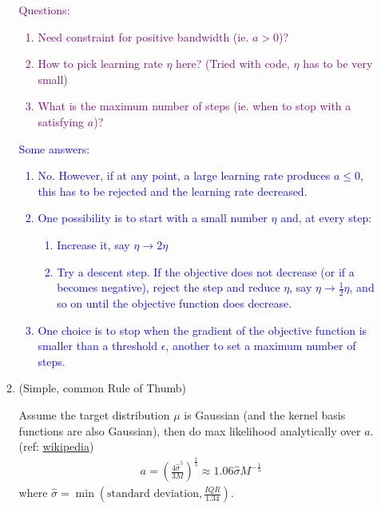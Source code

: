 \documentclass[11pt]{article}
\begin{document}
\begin{enumerate}
\begin{enumerate}
        \textcolor{purple}{
        Questions:
        \begin{enumerate}
            \item Need constraint for positive bandwidth (ie. $a>0$)?
            \item How to pick learning rate $\eta$ here? (Tried with code, $\eta$ has to be very small)
            \item What is the maximum number of steps (ie. when to stop with a satisfying $a$)?
        \end{enumerate}
        }
        
                \textcolor{blue}{
        Some answers:
        \begin{enumerate}
            \item No. However, if at any point, a large learning rate produces $a \le 0$, this has to be rejected and the learning rate decreased.
            \item One possibility is to start with a small number $\eta$ and, at every step:
            \begin{enumerate}
                \item Increase it, say $\eta \rightarrow 2\eta$
                \item Try a descent step. If the objective does not decrease (or if a becomes negative), reject the step and reduce $\eta$, say $\eta \rightarrow \frac{1}{2} \eta$, and so on until the objective function does decrease.
            \end{enumerate}
            \item One choice is to stop when the gradient of the objective function is smaller than a threshold $\epsilon$, another to set a maximum number of steps.
        \end{enumerate}
        }
        
        \item (Simple, common Rule of Thumb)
        
        Assume the target distribution $\mu$ is Gaussian (and the kernel basis functions are also Gaussian), then do max likelihood analytically over $a$. (ref: \href{https://en.wikipedia.org/wiki/Kernel_density_estimation}{wikipedia})
        \begin{align*}
            a = (\frac{4\hat{\sigma}^5}{3M})^{\frac{1}{5}} \approx
            1.06 \hat{\sigma} M^{-\frac{1}{5}}
        \end{align*}
        where $\hat{\sigma} = \min (\text{standard deviation}, \frac{IQR}{1.34})$.
        

\end{enumerate}
\end{enumerate}
\end{document}
